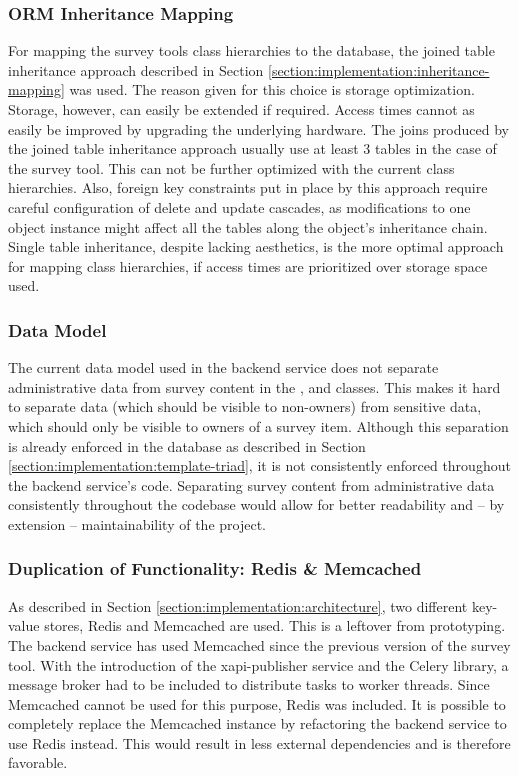     	\subsubsection{ORM Inheritance Mapping}
    		For mapping the survey tools class hierarchies to the database,
    		the joined table inheritance approach described in Section
    		\ref{section:implementation:inheritance-mapping} was used.
    		The reason given for this choice is storage optimization.
    		Storage, however, can easily be extended if required.
    		Access times cannot as easily be improved by upgrading the
    		underlying hardware. The joins produced by the joined table
    		inheritance approach usually use at least 3 tables in the
    		case of the survey tool. This can not be further optimized
    		with the current class hierarchies. Also, foreign key
    		constraints put in place by this approach require
    		careful configuration of delete and update cascades,
    		as modifications to one object instance might affect
    		all the tables along the object's inheritance chain.
    		Single table inheritance, despite lacking aesthetics,
    		is the more optimal approach for mapping class hierarchies,
    		if access times are prioritized over storage space used.

    	\subsubsection{Data Model}
    		The current data model used in the backend service does
    		not separate administrative data from survey content
    		in the ,  and
    		 classes. This makes it hard to separate
    		data (which should be visible to non-owners) from
    		sensitive data, which should only be visible to owners
    		of a survey item. Although this separation is already
    		enforced in the database as described in Section \ref{section:implementation:template-triad},
    		it is not consistently enforced throughout the backend service's
    		code. Separating survey content from administrative
    		data consistently throughout the codebase would
    		allow for better readability and -- by extension --
    		maintainability of the project.

        \subsubsection{Duplication of Functionality: Redis \& Memcached}
        	As described in Section \ref{section:implementation:architecture},
        	two different key-value stores, Redis and Memcached are used.
        	This is a leftover from prototyping. The backend service
        	has used Memcached since the previous version of the survey tool.
        	With the introduction of the xapi-publisher service and
        	the Celery library, a message broker had to be included
        	to distribute tasks to worker threads. Since Memcached
        	cannot be used for this purpose, Redis was included.
        	It is possible to completely replace the Memcached instance
        	by refactoring the backend service to use Redis instead.
        	This would result in less external dependencies and
     		is therefore favorable.

